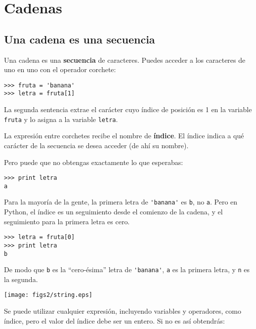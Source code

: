 
\chapter{Cadenas}
\label{strings}


\section{Una cadena es una secuencia}

Una cadena es una {\bf secuencia} de caracteres.
Puedes acceder a los caracteres de uno en uno con el
operador corchete:

\beforeverb
\begin{verbatim}
>>> fruta = 'banana'
>>> letra = fruta[1]
\end{verbatim}
\afterverb
%
La segunda sentencia extrae el carácter cuyo índice de posición es 1 en la
variable {\tt fruta} y lo asigna a la variable {\tt letra}.

La expresión entre corchetes recibe el nombre de {\bf índice}.
El índice indica a qué carácter de la secuencia se
desea acceder (de ahí su nombre).

Pero puede que no obtengas exactamente lo que esperabas:

\beforeverb
\begin{verbatim}
>>> print letra
a
\end{verbatim}
\afterverb
%
Para la mayoría de la gente, la primera letra de \verb"'banana'" es {\tt b}, no
{\tt a}. Pero en \mbox{Python}, el índice es un seguimiento desde el
comienzo de la cadena, y el seguimiento para la primera letra es cero.

\beforeverb
\begin{verbatim}
>>> letra = fruta[0]
>>> print letra
b
\end{verbatim}
\afterverb
%
De modo que {\tt b} es la ``cero-ésima'' letra de \verb"'banana'", {\tt a}
es la primera letra, y {\tt n} es la segunda.

\beforefig
\centerline{\texttt{[image: figs2/string.eps]}}
\afterfig


Se puede utilizar cualquier expresión, incluyendo variables y operadores, como índice,
pero el valor del índice debe ser un entero. Si no es así
obtendrás:

